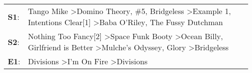 \begin{supertabular}{p{0.03\textwidth}p{0.92\textwidth}}
 \textbf{S1}:  &  Tango Mike\textsuperscript{} \textgreater \enspace Domino Theory\textsuperscript{}, \enspace \#5\textsuperscript{}, \enspace Bridgeless\textsuperscript{} \textgreater \enspace Example 1\textsuperscript{}, \enspace Intentions Clear[1]\textsuperscript{} \textgreater \enspace Baba O'Riley\textsuperscript{}, \enspace The Fussy Dutchman\textsuperscript{}  \enspace  \\
 \textbf{S2}:  &               Nothing Too Fancy[2]\textsuperscript{} \textgreater \enspace Space Funk Booty\textsuperscript{} \textgreater \enspace Ocean Billy\textsuperscript{}, \enspace Girlfriend is Better\textsuperscript{} \textgreater \enspace Mulche's Odyssey\textsuperscript{}, \enspace Glory\textsuperscript{} \textgreater \enspace Bridgeless\textsuperscript{}  \enspace  \\
 \textbf{E1}:  &                                                                                                                                                                                                                                Divisions\textsuperscript{} \textgreater \enspace I'm On Fire\textsuperscript{} \textgreater \enspace Divisions\textsuperscript{}  \enspace  \\
\end{supertabular}

